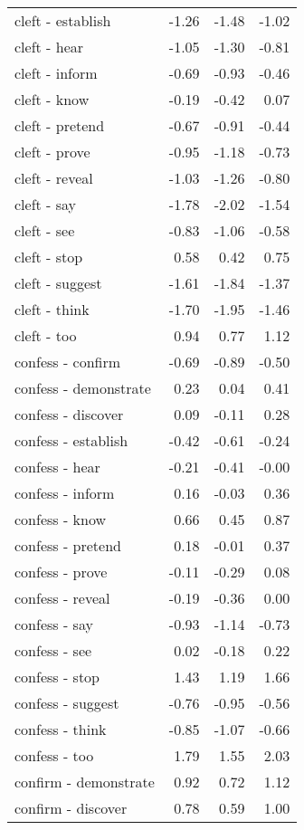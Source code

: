 \begin{longtable}{lrrr}
  cleft - establish & -1.26 & -1.48 & -1.02 \\ 
  cleft - hear & -1.05 & -1.30 & -0.81 \\ 
  cleft - inform & -0.69 & -0.93 & -0.46 \\ 
  cleft - know & -0.19 & -0.42 & 0.07 \\ 
  cleft - pretend & -0.67 & -0.91 & -0.44 \\ 
  cleft - prove & -0.95 & -1.18 & -0.73 \\ 
  cleft - reveal & -1.03 & -1.26 & -0.80 \\ 
  cleft - say & -1.78 & -2.02 & -1.54 \\ 
  cleft - see & -0.83 & -1.06 & -0.58 \\ 
  cleft - stop & 0.58 & 0.42 & 0.75 \\ 
  cleft - suggest & -1.61 & -1.84 & -1.37 \\ 
  cleft - think & -1.70 & -1.95 & -1.46 \\ 
  cleft - too & 0.94 & 0.77 & 1.12 \\ 
  confess - confirm & -0.69 & -0.89 & -0.50 \\ 
  confess - demonstrate & 0.23 & 0.04 & 0.41 \\ 
  confess - discover & 0.09 & -0.11 & 0.28 \\ 
  confess - establish & -0.42 & -0.61 & -0.24 \\ 
  confess - hear & -0.21 & -0.41 & -0.00 \\ 
  confess - inform & 0.16 & -0.03 & 0.36 \\ 
  confess - know & 0.66 & 0.45 & 0.87 \\ 
  confess - pretend & 0.18 & -0.01 & 0.37 \\ 
  confess - prove & -0.11 & -0.29 & 0.08 \\ 
  confess - reveal & -0.19 & -0.36 & 0.00 \\ 
  confess - say & -0.93 & -1.14 & -0.73 \\ 
  confess - see & 0.02 & -0.18 & 0.22 \\ 
  confess - stop & 1.43 & 1.19 & 1.66 \\ 
  confess - suggest & -0.76 & -0.95 & -0.56 \\ 
  confess - think & -0.85 & -1.07 & -0.66 \\ 
  confess - too & 1.79 & 1.55 & 2.03 \\ 
  confirm - demonstrate & 0.92 & 0.72 & 1.12 \\ 
  confirm - discover & 0.78 & 0.59 & 1.00 \\ 

\end{longtable}
